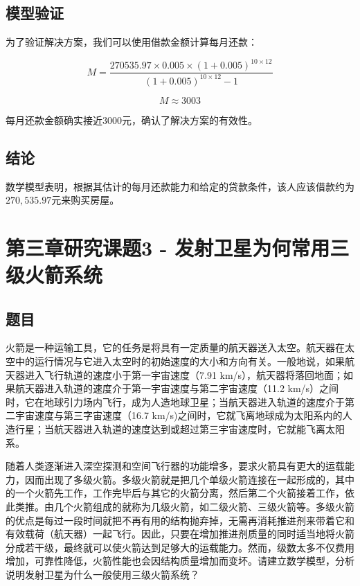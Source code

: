 \documentclass[a4,10pt,zihao=-4]{ctexart}
\begin{document}
\subsection{模型验证}

为了验证解决方案，我们可以使用借款金额计算每月还款：

\[
M = \frac{270535.97 \times 0.005 \times (1+0.005)^{10 \times 12}}{(1+0.005)^{10 \times 12}-1}
\]

\[
M \approx 3003
\]

每月还款金额确实接近$3000$元，确认了解决方案的有效性。

\subsection{结论}

数学模型表明，根据其估计的每月还款能力和给定的贷款条件，该人应该借款约为$270,535.97$元来购买房屋。










\newpage
\section{第三章研究课题3 - 发射卫星为何常用三级火箭系统}
\subsection{题目}
火箭是一种运输工具，它的任务是将具有一定质量的航天器送入太空。航天器在太空中的运行情况与它进入太空时的初始速度的大小和方向有关。一般地说，如果航天器进入飞行轨道的速度小于第一宇宙速度（7.91 km/s），航天器将落回地面；如果航天器进入轨道的速度介于第一宇宙速度与第二宇宙速度（11.2 km/s）之间时，它在地球引力场内飞行，成为人造地球卫星；当航天器进入轨道的速度介于第二宇宙速度与第三字宙速度（16.7 km/s)之间时，它就飞离地球成为太阳系内的人造行星；当航天器进入轨道的速度达到或超过第三宇宙速度时，它就能飞离太阳系。

随着人类逐渐进入深空探测和空间飞行器的功能增多，要求火箭具有更大的运载能力，因而出现了多级火箭。多级火箭就是把几个单级火箭连接在一起形成的，其中的一个火箭先工作，工作完毕后与其它的火箭分离，然后第二个火箭接着工作，依此类推。由几个火箭组成的就称为几级火箭，如二级火箭、三级火箭等。多级火箭的优点是每过一段时间就把不再有用的结构抛弃掉，无需再消耗推进剂来带着它和有效载荷（航天器）一起飞行。因此，只要在增加推进剂质量的同时适当地将火箭分成若干级，最终就可以使火箭达到足够大的运载能力。然而，级数太多不仅费用增加，可靠性降低，火箭性能也会因结构质量增加而变坏。请建立数学模型，分析说明发射卫星为什么一般使用三级火箭系统？
\end{document}
